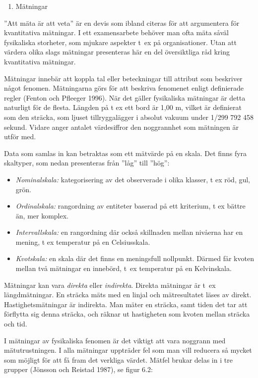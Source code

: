 \begin{enumerate}
\def\labelenumi{\arabic{enumi}.}
\item
  Mätningar
\end{enumerate}

''Att mäta är att veta'' är en devis som ibland citeras för att
argumentera för kvantitativa mätningar. I ett examensarbete behöver man
ofta mäta såväl fysikaliska storheter, som mjukare aspekter t~ex på
organisationer. Utan att värdera olika slags mätningar presenteras här
en del översiktliga råd kring kvantitativa mätningar.

Mätningar innebär att koppla tal eller beteckningar till attribut som
beskriver något fenomen. Mätningarna görs för att beskriva fenomenet
enligt definierade regler (Fenton och Pfleeger 1996). När det gäller
fysikaliska mätningar är detta naturligt för de flesta. Längden på t ex
ett bord är 1,00 m, vilket är definierat som den sträcka, som ljuset
tillryggalägger i absolut vakuum under 1/299 792 458 sekund. Vidare
anger antalet värdesiffror den noggrannhet som mätningen är utför med.

Data som samlas in kan betraktas som ett mätvärde på en skala. Det finns
fyra skaltyper, som nedan presenteras från ''låg'' till ''hög'':

\begin{itemize}
\item
  \emph{Nominalskala:} kategorisering av det observerade i olika
  klasser, t ex röd, gul, grön.
\item
  \emph{Ordinalskala:} rangordning av entiteter baserad på ett
  kriterium, t ex bättre än, mer komplex.
\item
  \emph{Intervallskala:} en rangordning där också skillnaden mellan
  nivåerna har en mening, t ex temperatur på en Celsiusskala.
\item
  \emph{Kvotskala:} en skala där det finns en meningsfull nollpunkt.
  Därmed får kvoten mellan två mätningar en innebörd, t~ex temperatur på
  en Kelvinskala.
\end{itemize}

Mätningar kan vara \emph{direkta} eller \emph{indirekta}. Direkta
mätningar är t~ex längdmätningar. En sträcka mäts med en linjal och
mätresultatet läses av direkt. Hastighetsmätningar är indirekta. Man
mäter en sträcka, samt tiden det tar att förflytta sig denna sträcka,
och räknar ut hastigheten som kvoten mellan sträcka och tid.

I mätningar av fysikaliska fenomen är det viktigt att vara noggrann med
mätutrustningen. I alla mätningar uppträder fel som man vill reducera så
mycket som möjligt för att få fram det verkliga värdet. Mätfel brukar
delas in i tre grupper (Jönsson och Reistad 1987), se figur 6.2:

